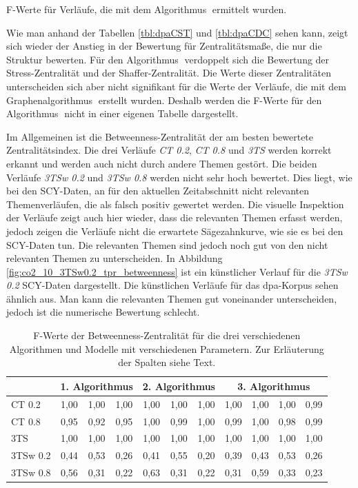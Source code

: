 \begin{table}[!ht]
\centering

\caption{F-Werte für Verläufe, die mit dem Algorithmus \CDC$\;$ermittelt wurden.}
\label{tbl:dpaCDC}
\end{table}

Wie man anhand der Tabellen \ref{tbl:dpaCST} und \ref{tbl:dpaCDC} sehen kann, zeigt sich wieder der Anstieg in der Bewertung für Zentralitätsmaße, die nur die Struktur bewerten. Für den Algorithmus \CDC$\;$verdoppelt sich die Bewertung der Stress-Zentralität und der Shaffer-Zentralität. Die Werte dieser Zentralitäten unterscheiden sich aber nicht signifikant für die Werte der Verläufe, die mit dem Graphenalgorithmus \TPR$\;$erstellt wurden. Deshalb werden die F-Werte für den Algorithmus \TPR$\;$nicht in einer eigenen Tabelle dargestellt.

Im Allgemeinen ist die Betweenness-Zentralität der am besten bewertete Zentralitätsindex. Die drei Verläufe \textit{CT 0.2}, \textit{CT 0.8} und \textit{3TS} werden korrekt erkannt und werden auch nicht durch andere Themen gestört. Die beiden Verläufe \textit{3TSw 0.2} und \textit{3TSw 0.8} werden nicht sehr hoch bewertet. Dies liegt, wie bei den SCY-Daten, an für den aktuellen Zeitabschnitt nicht relevanten Themenverläufen, die als falsch positiv gewertet werden. Die visuelle Inspektion der Verläufe zeigt auch hier wieder, dass die relevanten Themen erfasst werden, jedoch zeigen die Verläufe nicht die erwartete Sägezahnkurve, wie sie es bei den SCY-Daten tun. Die relevanten Themen sind jedoch noch gut von den nicht relevanten Themen zu unterscheiden. In Abbildung \ref{fig:co2_10_3TSw0.2_tpr_betweenness} ist ein künstlicher Verlauf für die \textit{3TSw 0.2} SCY-Daten dargestellt. Die künstlichen Verläufe für das dpa-Korpus sehen ähnlich aus. Man kann die relevanten Themen gut voneinander unterscheiden, jedoch ist die numerische Bewertung schlecht.

\begin{table}[!ht]
\centering
\begin{tabular}[ht]{l|c|c|c||c|c|c||c|c|c|c}
\hline
\hline
	& \multicolumn{3}{c||}{1. Algorithmus \CST} & \multicolumn{3}{c||}{2. Algorithmus \CDC} & \multicolumn{4}{c}{3. Algorithmus \TPR}\\
\hline
\hline
CT 0.2	 & 1,00 & 1,00 & 1,00 & 1,00 & 1,00 & 1,00 & 1,00 & 1,00 & 1,00 & 0,99\\
CT 0.8	 & 0,95 & 0,92 & 0,95 & 1,00 & 0,99 & 1,00 & 0,99 & 1,00 & 0,98 & 0,99\\
3TS		 & 1,00 & 1,00 & 1,00 & 1,00 & 1,00 & 1,00 & 1,00 & 1,00 & 1,00 & 1,00\\
3TSw 0.2 & 0,44 & 0,53 & 0,26 & 0,41 & 0,55 & 0,20 & 0,39 & 0,43 & 0,53 & 0,26\\
3TSw 0.8 & 0,56 & 0,31 & 0,22 & 0,63 & 0,31 & 0,22 & 0,31 & 0,59 & 0,33 & 0,23\\
\hline
\hline
\end{tabular}
\caption{F-Werte der Betweenness-Zentralität für die drei verschiedenen Algorithmen und Modelle mit verschiedenen Parametern. Zur Erläuterung der Spalten siehe Text.}
\label{tbl:betweennessCentralityFScore}
\end{table}

